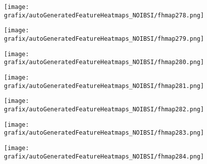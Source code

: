 \begin{subfigure}{\wid\textwidth} 
    \centering 
    \caption{\tiny \sffamily {}} 
    \vspace{\vsp} 
    \texttt{[image: grafix/autoGeneratedFeatureHeatmaps\_NOIBSI/fhmap278.png]} 
\end{subfigure} 
\hspace{\hsp} 
\begin{subfigure}{\wid\textwidth} 
    \centering 
    \caption{\tiny \sffamily {}} 
    \vspace{\vsp} 
    \texttt{[image: grafix/autoGeneratedFeatureHeatmaps\_NOIBSI/fhmap279.png]} 
\end{subfigure} 
\hspace{\hsp} 
\begin{subfigure}{\wid\textwidth} 
    \centering 
    \caption{\tiny \sffamily {}} 
    \vspace{\vsp} 
    \texttt{[image: grafix/autoGeneratedFeatureHeatmaps\_NOIBSI/fhmap280.png]} 
\end{subfigure} 
\hspace{\hsp} 
\begin{subfigure}{\wid\textwidth} 
    \centering 
    \caption{\tiny \sffamily {}} 
    \vspace{\vsp} 
    \texttt{[image: grafix/autoGeneratedFeatureHeatmaps\_NOIBSI/fhmap281.png]} 
\end{subfigure} 
\hspace{\hsp} 
\begin{subfigure}{\wid\textwidth} 
    \centering 
    \caption{\tiny \sffamily {}} 
    \vspace{\vsp} 
    \texttt{[image: grafix/autoGeneratedFeatureHeatmaps\_NOIBSI/fhmap282.png]} 
\end{subfigure} 
\hspace{\hsp} 
\begin{subfigure}{\wid\textwidth} 
    \centering 
    \caption{\tiny \sffamily {}} 
    \vspace{\vsp} 
    \texttt{[image: grafix/autoGeneratedFeatureHeatmaps\_NOIBSI/fhmap283.png]} 
\end{subfigure} 
\hspace{\hsp} 
\begin{subfigure}{\wid\textwidth} 
    \centering 
    \caption{\tiny \sffamily {}} 
    \vspace{\vsp} 
    \texttt{[image: grafix/autoGeneratedFeatureHeatmaps\_NOIBSI/fhmap284.png]} 
\end{subfigure} 
